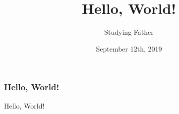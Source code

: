 \documentclass{beamer}
\title{Hello, World!}
\author{Studying Father}
\institute{SFOI Team}
\date{September 12th, 2019}
\begin{document}
    \frame{\titlepage}%
    \begin{frame}
        \frametitle{Hello, World!}
        Hello, World!
    \end{frame}
\end{document}
